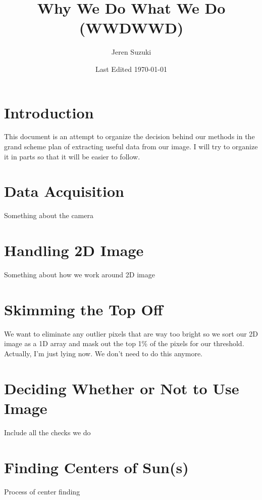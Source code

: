 \documentclass[10pt]{article}
\title{Why We Do What We Do (WWDWWD)}
\author{Jeren Suzuki}
\date{Last Edited \today}
\begin{document}
\maketitle
{}
\tableofcontents
{}
\clearpage
{}

\section*{Introduction} %
\label{sec:introduction}
    This document is an attempt to organize the decision behind our methods in the grand scheme plan of extracting useful data from our image. I will try to organize it in parts so that it will be easier to follow.

\section{Data Acquisition} %
\label{sec:data_acquisition}
Something about the camera

\section{Handling 2D Image} %
\label{sec:handling_2d_image}
Something about how we work around 2D image

\section{Skimming the Top Off} %
\label{sec:skimming_the_top_off}
We want to eliminate any outlier pixels that are way too bright so we sort our 2D image as a 1D array and mask out the top 1\% of the pixels for our threshold. Actually, I'm just lying now. We don't need to do this anymore.

\section{Deciding Whether or Not to Use Image} %
\label{sec:deciding_whether_or_not_to_use_image}
Include all the checks we do

\section{Finding Centers of Sun(s)} %
\label{sec:finding_centers_of_sun}
Process of center finding
\end{document}
